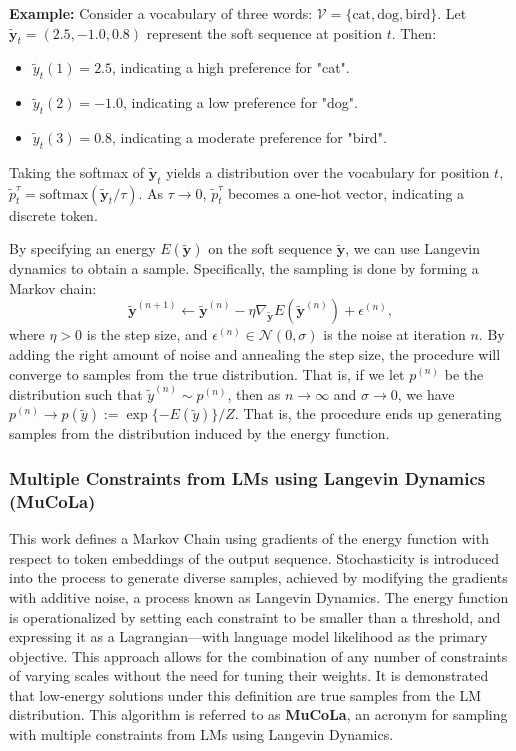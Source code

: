 \documentclass{article}
\begin{document}
\textbf{Example:}
Consider a vocabulary of three words: $\mathcal{V} = \{\text{cat}, \text{dog}, \text{bird}\}$.
Let $\tilde{\boldsymbol{y}}_t = (2.5, -1.0, 0.8)$ represent the soft sequence at position $t$.
Then:
\begin{itemize}
    \item $\tilde{y}_t(1) = 2.5$, indicating a high preference for "cat".
    \item $\tilde{y}_t(2) = -1.0$, indicating a low preference for "dog".
    \item $\tilde{y}_t(3) = 0.8$, indicating a moderate preference for "bird".
\end{itemize}

Taking the softmax of $\tilde{\boldsymbol{y}}_t$ yields a distribution over the vocabulary for position $t$, $\tilde{p}_t^\tau = \text{softmax}(\tilde{\boldsymbol{y}}_t/\tau)$. As $\tau \rightarrow 0$, $\tilde{p}_t^\tau$ becomes a one-hot vector, indicating a discrete token.

By specifying an energy $E(\tilde{\boldsymbol{y}})$ on the soft sequence $\tilde{\boldsymbol{y}}$, we can use Langevin dynamics to obtain a sample. Specifically, the sampling is done by forming a Markov chain:
\begin{equation}
\tilde{\boldsymbol{y}}^{(n+1)} \leftarrow \tilde{\boldsymbol{y}}^{(n)} - \eta \nabla_{\tilde{\boldsymbol{y}}} E(\tilde{\boldsymbol{y}}^{(n)}) + \epsilon^{(n)},
\label{eq:langevin}
\end{equation}
where $\eta > 0$ is the step size, and $\epsilon^{(n)} \in \mathcal{N}(0, \sigma)$ is the noise at iteration $n$. By adding the right amount of noise and annealing the step size, the procedure will converge to samples from the true distribution. That is, if we let $p^{(n)}$ be the distribution such that $\tilde{y}^{(n)} \sim p^{(n)}$, then as $n \rightarrow \infty$ and $\sigma \rightarrow 0$, we have $p^{(n)} \rightarrow p(\tilde{y}) := \exp\{-E(\tilde{y})\}/Z$. That is, the procedure ends up generating samples from the distribution induced by the energy function.





\subsubsection{Multiple Constraints from LMs using Langevin Dynamics (MuCoLa)} \cite[]{mucola}
This work defines a Markov Chain using gradients of the energy function with respect to token embeddings of the output sequence. Stochasticity is introduced into the process to generate diverse samples, achieved by modifying the gradients with additive noise, a process known as Langevin Dynamics. The energy function is operationalized by setting each constraint to be smaller than a threshold, and expressing it as a Lagrangian—with language model likelihood as the primary objective. This approach allows for the combination of any number of constraints of varying scales without the need for tuning their weights. It is demonstrated that low-energy solutions under this definition are true samples from the LM distribution. This algorithm is referred to as \textbf{MuCoLa}, an acronym for sampling with multiple constraints from LMs using Langevin Dynamics.
\end{document}
